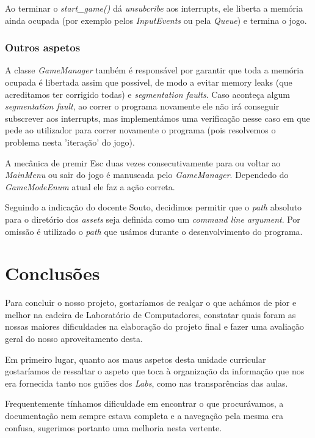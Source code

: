 \documentclass{report}
\begin{document}
Ao terminar o \textit{start\_game()} dá \textit{unsubcribe} aos interrupts, ele liberta a memória ainda ocupada (por exemplo pelos \textit{InputEvents} ou pela \textit{Queue}) e termina o jogo.

\subsection{Outros aspetos}

A classe \textit{GameManager} também é responsável por garantir que toda a memória ocupada é libertada assim que possível, de modo a evitar memory leaks (que acreditamos ter corrigido todas) e \textit{segmentation faults}. Caso aconteça algum \textit{segmentation fault}, ao correr o programa novamente ele não irá conseguir subscrever aos interrupts, mas implementámos uma verificação nesse caso em que pede ao utilizador para correr novamente o programa (pois resolvemos o problema nesta 'iteração' do jogo).

A mecânica de premir Esc duas vezes consecutivamente para ou voltar ao \textit{MainMenu} ou sair do jogo é manuseada pelo \textit{GameManager}. Dependedo do \textit{GameModeEnum} atual ele faz a ação correta.

Seguindo a indicação do docente Souto, decidimos permitir que o \textit{path} absoluto para o diretório dos \textit{assets} seja definida como um \textit{command line argument}. Por omissão é utilizado o \textit{path} que usámos durante o desenvolvimento do programa.

\chapter{Conclusões}

Para concluir o nosso projeto, gostaríamos de realçar o que achámos de pior e melhor na cadeira de Laboratório de Computadores, constatar quais foram as nossas maiores dificuldades na elaboração do projeto final e fazer uma avaliação geral do nosso aproveitamento desta.

Em primeiro lugar, quanto aos maus aspetos desta unidade curricular gostaríamos de ressaltar o aspeto que toca à organização da informação que nos era fornecida tanto nos guiões dos \textit{Labs}, como nas transparências das aulas. 

Frequentemente tínhamos dificuldade em encontrar o que procurávamos, a documentação nem sempre estava completa e a navegação pela mesma era confusa, sugerimos portanto uma melhoria nesta vertente.
\end{document}
